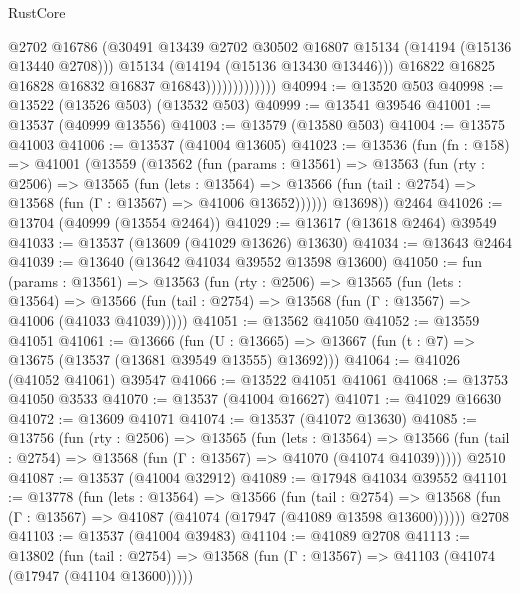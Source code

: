 \begin{lexlean}{RustCore}
\begin{coremodule}
                                @2702
                                @16786
                                (@30491
                                  @13439
                                  @2702
                                  @30502
                                  @16807
                                  @15134
                                  (@14194 (@15136 @13440 @2708)))
                                @15134
                                (@14194 (@15136 @13430 @13446)))
                              @16822
                              @16825
                              @16828
                              @16832
                              @16837
                              @16843)))))))))))))
@40994 := @13520 @503
@40998 := @13522 (@13526 @503) (@13532 @503)
@40999 := @13541 @39546
@41001 := @13537 (@40999 @13556)
@41003 := @13579 (@13580 @503)
@41004 := @13575 @41003
@41006 := @13537 (@41004 @13605)
@41023 := @13536
    (fun (fn : @158) =>
    @41001
      (@13559
        (@13562
          (fun (params : @13561) =>
          @13563
            (fun (rty : @2506) =>
            @13565
              (fun (lets : @13564) =>
              @13566 (fun (tail : @2754) => @13568 (fun (Γ : @13567) => @41006 @13652))))))
        @13698))
    @2464
@41026 := @13704 (@40999 (@13554 @2464))
@41029 := @13617 (@13618 @2464) @39549
@41033 := @13537 (@13609 (@41029 @13626) @13630)
@41034 := @13643 @2464
@41039 := @13640 (@13642 @41034 @39552 @13598 @13600)
@41050 := fun (params : @13561) =>
  @13563
    (fun (rty : @2506) =>
    @13565
      (fun (lets : @13564) =>
      @13566 (fun (tail : @2754) => @13568 (fun (Γ : @13567) => @41006 (@41033 @41039)))))
@41051 := @13562 @41050
@41052 := @13559 @41051
@41061 := @13666
    (fun (U : @13665) => @13667 (fun (t : @7) => @13675 (@13537 (@13681 @39549 @13555) @13692)))
@41064 := @41026 (@41052 @41061) @39547
@41066 := @13522 @41051 @41061
@41068 := @13753 @41050 @3533
@41070 := @13537 (@41004 @16627)
@41071 := @41029 @16630
@41072 := @13609 @41071
@41074 := @13537 (@41072 @13630)
@41085 := @13756
    (fun (rty : @2506) =>
    @13565
      (fun (lets : @13564) =>
      @13566 (fun (tail : @2754) => @13568 (fun (Γ : @13567) => @41070 (@41074 @41039)))))
    @2510
@41087 := @13537 (@41004 @32912)
@41089 := @17948 @41034 @39552
@41101 := @13778
    (fun (lets : @13564) =>
    @13566
      (fun (tail : @2754) =>
      @13568 (fun (Γ : @13567) => @41087 (@41074 (@17947 (@41089 @13598 @13600))))))
    @2708
@41103 := @13537 (@41004 @39483)
@41104 := @41089 @2708
@41113 := @13802
    (fun (tail : @2754) => @13568 (fun (Γ : @13567) => @41103 (@41074 (@17947 (@41104 @13600)))))

\end{coremodule}
\end{lexlean}
